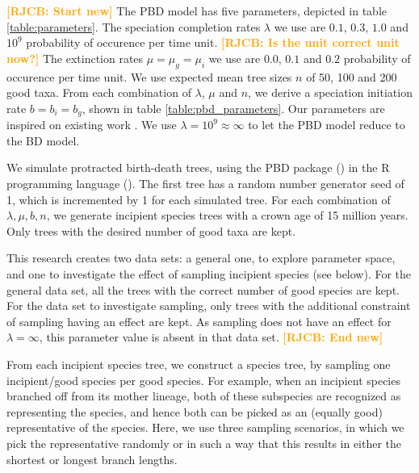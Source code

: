 \documentclass{article}
\newcommand*\richel[1]{\textcolor{orange}{\textbf{[RJCB: #1]}}}
\begin{document}

\richel{Start new}
The PBD model has five parameters, depicted in table \ref{table:parameters}. 
The speciation completion rates $\lambda$ we use are $0.1$, $0.3$, $1.0$ and $10^9$ probability of occurence per time unit. 
\richel{Is the unit correct unit now?}
The extinction rates $\mu = \mu_g = \mu_i$ we use are $0.0$, $0.1$ and $0.2$ probability of occurence per time unit.
We use expected mean tree sizes $n$ of 50, 100 and 200 good taxa.
From each combination of $\lambda$, $\mu$ and $n$, we derive a speciation initiation rate $b = b_i = b_g$, shown in table \ref{table:pbd_parameters}.
Our parameters are inspired on existing work \cite{etienne_and_rosindell_2012}\cite{etienne2014}.
We use $\lambda = 10^9 \approx \infty$ to let the PBD model reduce to the BD model.

We simulate protracted birth-death trees, using the PBD package (\cite{pbd}) in the R programming language (\cite{r}).
The first tree has a random number generator seed of 1, which is incremented by 1 for each simulated tree.
For each combination of ${\lambda, \mu, b, n}$, we generate incipient species trees with a crown age of 15 million years.
Only trees with the desired number of good taxa are kept.

This research creates two data sets: a general one, to explore parameter space, 
and one to investigate the effect of sampling incipient species (see below).
For the general data set, all the trees with the correct number of good species are kept.
For the data set to investigate sampling, only trees with the additional constraint of sampling having an effect are kept.
As sampling does not have an effect for $\lambda = \infty$, this parameter value is absent in that data set.
\richel{End new}

From each incipient species tree, we construct a species tree,
by sampling one incipient/good species per good species. 
For example, when an
incipient species branched off from its mother lineage, 
both of these subspecies are recognized as representing the species, 
and hence both can be picked as an (equally good) representative of the species. 
Here, we use three sampling scenarios,
in which we pick the representative randomly or in such a way that this
results in either the shortest or longest branch lengths. 
\end{document}
